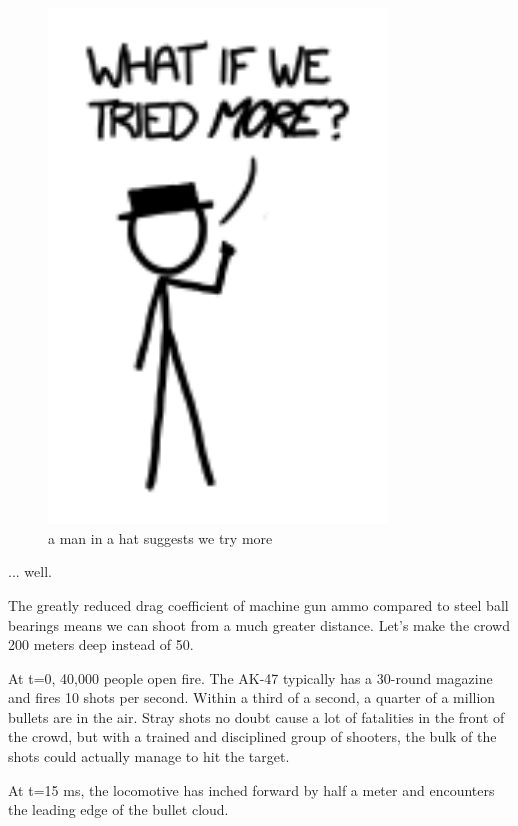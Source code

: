 \begin{figure}[!htbp]
\centering
\includegraphics[scale=0.5, max width=0.8\textwidth]{imgs/a/18/bb_more.png}
\caption{a man in a hat suggests we try more}
\end{figure}

{... well.}

{The greatly reduced drag coefficient of machine gun ammo compared to steel ball bearings means we can shoot from a much greater distance. Let’s make the crowd 200 meters deep instead of 50.}

{At t=0, 40,000 people open fire. The AK-47 typically has a 30-round magazine and fires 10 shots per second. Within a third of a second, a quarter of a million bullets are in the air. Stray shots no doubt cause a lot of fatalities in the front of the crowd, but with a trained and disciplined group of shooters, the bulk of the shots could actually manage to hit the target.}

{At t=15 ms, the locomotive has inched forward by half a meter and encounters the leading edge of the bullet cloud.}

